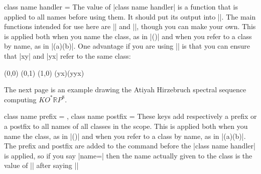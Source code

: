 \begin{sseqdata}[name = basic, cohomological Serre grading]
\begin{key}{class name handler = }
The value of |class name handler| is a function that is applied to all names before using them. It should put its output into |\result|.
The main functions intended for use here are |\SseqAHSSNameHandler| and |\SseqNormalizeMonomial|, though you can make your own. This is applied both when you name the class, as in \codeverb|\class[name=a]()| and when you refer to a class by name, as in |\structline(a)(b)|. One advantage if you are using |\SseqNormalizeMonomial| is that you can ensure that |xy| and |yx| refer to the same class:
\begin{codeexample}[]
\begin{sseqpage}[ class name handler = \SseqNormalizeMonomial,
                  classes = {show name = {right,pin}} ]
\class[name = xy](0,0)
\class[name = yxy](0,1)
\class(1,0)
\structline(yx)(yyx)
\end{sseqpage}
\end{codeexample}
The next page is an example drawing the Atiyah Hirzebruch spectral sequence computing $KO^*\mathbb{R}P^{8}$.
\end{key}

\begin{keylist}{class name prefix = , class name postfix = }
These keys add respectively a prefix or a postfix to all names of all classes in the scope. This is applied both when you name the class, as in \codeverb|\class[name=a]()| and when you refer to a class by name, as in |\structline(a)(b)|.
The prefix and postfix are added to the command before the |class name handler| is applied, so if you say |name=| then the name actually given to the class is the value of |\result| after saying ||
\end{keylist}


\end{sseqdata}
